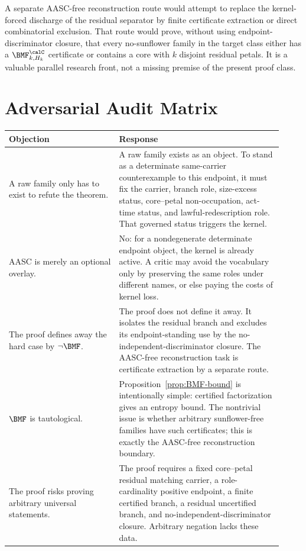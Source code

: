 \documentclass[11pt]{article}
\begin{document}
A separate AASC-free reconstruction route would attempt to replace the kernel-forced discharge of the residual separator by finite certificate extraction or direct combinatorial exclusion.  That route would prove, without using endpoint-discriminator closure, that every no-sunflower family in the target class either has a \(\BMF^{\calC}_{k,H_k}\) certificate or contains a core with \(k\) disjoint residual petals.  It is a valuable parallel research front, not a missing premise of the present proof class.

\appendix

\section{Adversarial Audit Matrix}

\begin{center}
\begin{tabular}{p{0.37\linewidth}p{0.55\linewidth}}
\toprule
Objection & Response \\
\midrule
A raw family only has to exist to refute the theorem. & A raw family exists as an object.  To stand as a determinate same-carrier counterexample to this endpoint, it must fix the carrier, branch role, size-excess status, core--petal non-occupation, act-time status, and lawful-redescription role.  That governed status triggers the kernel. \\
\addlinespace
AASC is merely an optional overlay. & No: for a nondegenerate determinate endpoint object, the kernel is already active.  A critic may avoid the vocabulary only by preserving the same roles under different names, or else paying the costs of kernel loss. \\
\addlinespace
The proof defines away the hard case by \(\neg\BMF\). & The proof does not define it away.  It isolates the residual branch and excludes its endpoint-standing use by the no-independent-discriminator closure.  The AASC-free reconstruction task is certificate extraction by a separate route. \\
\addlinespace
\(\BMF\) is tautological. & Proposition~\ref{prop:BMF-bound} is intentionally simple: certified factorization gives an entropy bound.  The nontrivial issue is whether arbitrary sunflower-free families have such certificates; this is exactly the AASC-free reconstruction boundary. \\
\addlinespace
The proof risks proving arbitrary universal statements. & The proof requires a fixed core--petal residual matching carrier, a role-cardinality positive endpoint, a finite certified branch, a residual uncertified branch, and no-independent-discriminator closure.  Arbitrary negation lacks these data. \\

\end{tabular}
\end{center}
\end{document}
